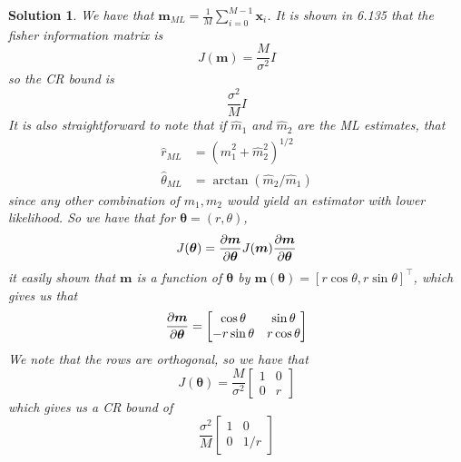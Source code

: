 \documentclass[a4paper]{article}
\newtheorem*{sol}{Solution}
\begin{document}
\begin{sol}
  We have that $\hat{\bm{m}}_{ML} = \frac{1}{M}\sum_{i=0}^{M-1} \bm{x}_i$. It is shown in 6.135 that the fisher information matrix is 
  \[
    J(\bm{m}) = \frac{M}{\sigma^2} I
  \]
  so the CR bound is
  \[
    \frac{\sigma^2}{M} I
  \]
  It is also straightforward to note that if $\hat{m}_1$ and $\hat{m}_2$ are the ML estimates, that
  \[
    \begin{aligned}
      \hat{r}_{ML} &= (\hat{m}_1^2 + \hat{m}_2^2)^{1/2} \\
      \hat{\theta}_{ML} &= \arctan(\hat{m}_2/ \hat{m}_1)
    \end{aligned}
  \]
  since any other combination of $m_1, m_2$ would yield an estimator with lower likelihood. So we have that for $\bm{\theta} = (r, \theta)$, 
  \[
    J(\bm{\theta}) = \pdv{\bm{m}}{\bm{\theta}} J(\bm{m}) \pdv{\bm{m}}{\bm{\theta}}
  \]
  it easily shown that $\bm{m}$ is a function of $\bm{\theta}$ by $\bm{m}(\bm{\theta}) = [r \cos \theta, r \sin \theta]^\top$, which gives us that
  \[
    \pdv{\bm{m}}{\bm{\theta}} = 
    \begin{bmatrix}
      \cos \theta & \sin \theta \\
      -r \sin \theta & r \cos \theta
    \end{bmatrix}
  \]
  We note that the rows are orthogonal, so we have that
  \[
    J(\bm{\theta}) = \frac{M}{\sigma^2} 
    \begin{bmatrix}
      1 & 0 \\
      0 & r
    \end{bmatrix}
  \]
  which gives us a CR bound of 
  \[
    \frac{\sigma^2}{M}
    \begin{bmatrix}
      1 & 0 \\
      0 & 1/r
    \end{bmatrix}
  \]
\end{sol}
\end{document}
